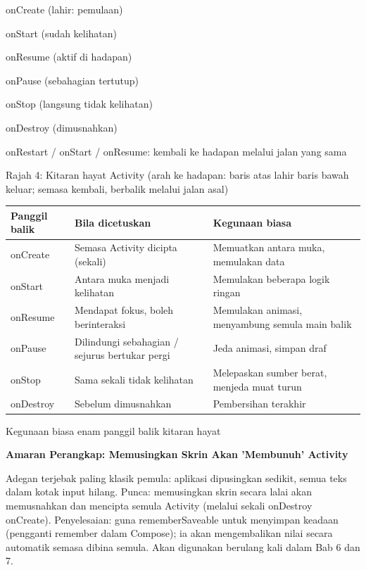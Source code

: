 onCreate (lahir: pemulaan)

onStart (sudah kelihatan)

onResume (aktif di hadapan)

onPause (sebahagian tertutup)

onStop (langsung tidak kelihatan)

onDestroy (dimusnahkan)

onRestart / onStart / onResume: kembali ke hadapan melalui jalan yang sama

\begin{center}\small\color{gray}Rajah 4: Kitaran hayat Activity (arah ke hadapan: baris atas lahir baris bawah keluar; semasa kembali, berbalik melalui jalan asal)\end{center}

\begin{center}
\begin{tabularx}{\linewidth}{|X|X|X|}
\hline
\textbf{Panggil balik} & \textbf{Bila dicetuskan} & \textbf{Kegunaan biasa} \tabularnewline
\hline
onCreate & Semasa Activity dicipta (sekali) & Memuatkan antara muka, memulakan data \tabularnewline
onStart & Antara muka menjadi kelihatan & Memulakan beberapa logik ringan \tabularnewline
onResume & Mendapat fokus, boleh berinteraksi & Memulakan animasi, menyambung semula main balik \tabularnewline
onPause & Dilindungi sebahagian / sejurus bertukar pergi & Jeda animasi, simpan draf \tabularnewline
onStop & Sama sekali tidak kelihatan & Melepaskan sumber berat, menjeda muat turun \tabularnewline
onDestroy & Sebelum dimusnahkan & Pembersihan terakhir \tabularnewline
\hline
\end{tabularx}
\end{center}

\begin{center}\small\color{gray}Kegunaan biasa enam panggil balik kitaran hayat\end{center}

\textbf{Amaran Perangkap: Memusingkan Skrin Akan 'Membunuh' Activity}\par

Adegan terjebak paling klasik pemula: aplikasi dipusingkan sedikit, semua teks dalam kotak input hilang. Punca: memusingkan skrin secara lalai akan memusnahkan dan mencipta semula Activity (melalui sekali onDestroy onCreate). Penyelesaian: guna rememberSaveable untuk menyimpan keadaan (pengganti remember dalam Compose); ia akan mengembalikan nilai secara automatik semasa dibina semula. Akan digunakan berulang kali dalam Bab 6 dan 7.

